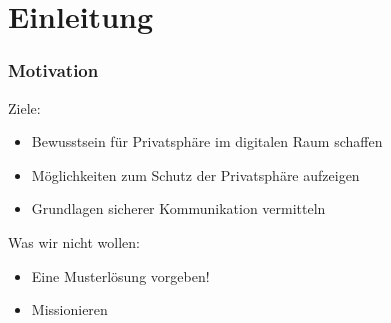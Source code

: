 \section{Einleitung}

\begin{frame}
  \frametitle{Motivation}

  Ziele:
  \begin{itemize}
   \item Bewusstsein für Privatsphäre im digitalen Raum schaffen
   \item Möglichkeiten zum Schutz der Privatsphäre aufzeigen
   \item Grundlagen sicherer Kommunikation vermitteln
  \end{itemize}

  \vspace{2ex}

  Was wir nicht wollen:
  \begin{itemize}
    \item Eine Musterlösung vorgeben!
    \item Missionieren
  \end{itemize}
\end{frame}

